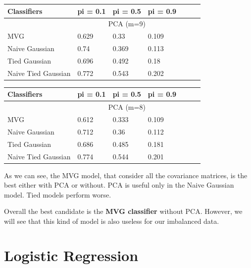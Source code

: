 \documentclass[english]{report}
\begin{document}
\begin{table}[H]
    \centering
    \begin{tabular}{@{}lllllll@{}}
    \toprule
    Classifiers         & pi = 0.1 & pi = 0.5 & pi = 0.9 \\ \midrule
                        & \multicolumn{3}{c}{PCA (m=9)}  \\ \midrule
    MVG                 & 0.629    & 0.33    & 0.109    \\
    Naive Gaussian      & 0.74    & 0.369    & 0.113    \\
    Tied Gaussian       & 0.696    & 0.492    & 0.18    \\
    Naive Tied Gaussian & 0.772    & 0.543    & 0.202    \\ \bottomrule
    \end{tabular}
    \label{tab:MVG_PCA9_valid}
\end{table}

\begin{table}[H]
    \centering
    \begin{tabular}{@{}lllllll@{}}
    \toprule
    Classifiers         & pi = 0.1 & pi = 0.5 & pi = 0.9 \\ \midrule
                        & \multicolumn{3}{c}{PCA (m=8)}  \\ \midrule
    MVG                 & 0.612    & 0.333    & 0.109    \\
    Naive Gaussian      & 0.712     & 0.36    & 0.112    \\
    Tied Gaussian       & 0.686    & 0.485    & 0.181    \\
    Naive Tied Gaussian & 0.774    & 0.544    & 0.201    \\ \bottomrule
    \end{tabular}
    \label{tab:MVG_PCA8_valid}
\end{table}

As we can see, the MVG model, that consider all the covariance matrices, is the best either with PCA or without.
PCA is useful only in the Naive Gaussian model.
Tied models perform worse.

Overall the best candidate is the \textbf{MVG classifier} without PCA. However, we will see that this kind of model is also
useless for our imbalanced data.

\clearpage

\section{Logistic Regression}
\end{document}

